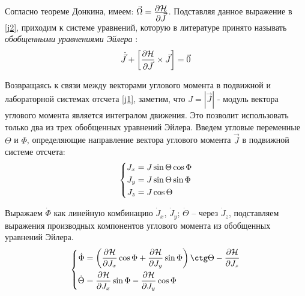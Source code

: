 Согласно теореме Донкина, имеем: $\vec{\Omega} = \frac{\displaystyle \partial \mathcal{H}}{\displaystyle \partial \vec{J}}$. Подставляя данное выражение в \eqref{j2}, приходим к системе уравнений, которую в литературе принято называть \textit{обобщенными уравнениями Эйлера} \cite{petrov2015}:
\vverh
\begin{gather}
\dot{\vec{J}} + \left[ \frac{\partial \mathcal{H}}{\partial \vec{J}} \times \vec{J} \right] = \vec{0} \notag
\end{gather}

Возвращаясь к связи между векторами углового момента в подвижной и лабораторной системах отсчета \eqref{j1}, заметим, что $J = | \vec{J} |$ - модуль вектора углового момента является интегралом движения. Это позволит использовать только два из трех обобщенных уравнений Эйлера. Введем угловые переменные $\Theta$ и $\Phi$, определяющие направление вектора углового момента $\vec{J}$ в подвижной системе отсчета:
\vverh
\begin{gather}
\left\{
\begin{aligned}
J_x &= J \sin \Theta \cos \Phi \\
J_y &= J \sin \Theta \sin \Phi \\
J_z &= J \cos \Theta
\end{aligned}
\right. \notag
\end{gather}

Выражаем $\dot{\Phi}$ как линейную комбинацию $\dot{J}_x$, $\dot{J}_y$; $\dot{\Theta}$ -- через $\dot{J}_z$, подставляем выражения производных компонентов углового момента из обобщенных уравнений Эйлера. 
\vverh
\begin{gather}
\left\{
\begin{aligned}
\dot{\Phi} &= \lb \frac{\partial \mathcal{H}}{\partial J_x} \cos \Phi + \frac{\partial \mathcal{H}}{\partial J_y} \sin \Phi \rb \ctg \Theta - \frac{\partial \mathcal{H}}{\partial J_z} \\
\dot{\Theta} &= \frac{\partial \mathcal{H}}{\partial J_x} \sin \Phi - \frac{\partial \mathcal{H}}{\partial J_y} \cos \Phi 
\end{aligned}
\right. \notag
\end{gather}

